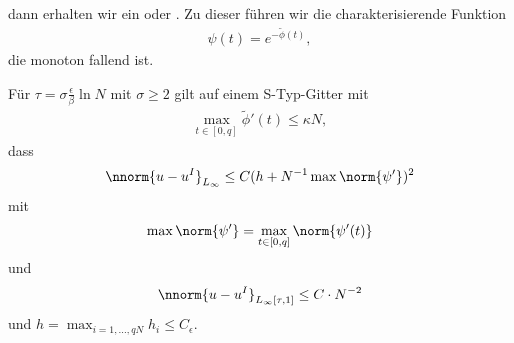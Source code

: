 dann erhalten wir ein  oder . 
Zu dieser führen wir die charakterisierende Funktion
\begin{align*}
  \psi(t) = e^{- \tilde \phi (t)}, 
\end{align*}
die monoton fallend ist. 
\begin{folgerung}\label{6-13}
  Für $\tau = \sigma \frac \epsilon \beta \ln N$ mit $\sigma \geq 2$ gilt auf einem S-Typ-Gitter mit
  \begin{align*}
    \max_{t \in [0, q]} \tilde \phi'(t) \leq \kappa N,
  \end{align*}
  dass
  \begin{align*}
    \nnorm{u - u^{I}}_{L_{\infty}} \leq C ( h + N^{-1} \max \norm{\psi'})^{2}  
  \end{align*}
  mit
  \begin{align*}
    \max \norm{\psi'} =   \max_{t \in [0, q]} \norm{\psi'(t)} 
  \end{align*}
  und
  \begin{align*}
    \nnorm{u - u^{I}}_{L_{\infty}[\tau, 1]} \leq C \cdot N^{-2}
  \end{align*}
  und $h = \max_{i = 1, \dots, q N} h_{i} \leq C_{\epsilon}$.  
\end{folgerung}
